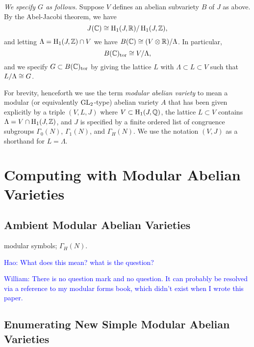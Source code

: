 \documentclass{article}
\newcommand{\Hao}[1]{\textcolor{blue}{\textsf{Hao: #1}}}
\newcommand{\wstein}[1]{\textcolor{blue}{\textsf{William: #1}}}
\begin{document}
{\em We specify $G$ as follows.}
Suppose $V$ defines an abelian subvariety $B$ of $J$ as above.
By the Abel-Jacobi theorem, we have
$$
 J(\mathbb{C}) \cong \operatorname{H}_1(J, \mathbb{R}) / \operatorname{H}_1(J,\mathbb{Z}),
$$
and letting $\Lambda = \operatorname{H}_1(J,\mathbb{Z}) \cap V$ we have
$B(\mathbb{C}) \cong (V\otimes\mathbb{R}) / \Lambda$.
In particular,
$$
  B(\mathbb{C})_{\operatorname{tor}} \cong V/\Lambda,
$$
and we specify $G\subset B(\mathbb{C})_{\operatorname{tor}}$ by giving the lattice $L$ with
$\Lambda \subset L\subset V$ such that $L/\Lambda \cong G$.


For brevity, henceforth we use the term {\em modular abelian variety}
to mean a modular (or equivalently $\operatorname{GL}_2$-type) abelian variety $A$
that has been given explicitly by a triple $(V,L,J)$ where $V\subset
\operatorname{H}_1(J,\mathbb{Q})$, the lattice $L\subset V$ contains $\Lambda = V\cap
\operatorname{H}_1(J,\mathbb{Z})$, and $J$ is specified by a finite ordered list of
congruence subgroups $\Gamma_0(N)$, $\Gamma_1(N)$, and $\Gamma_H(N)$.
We use the notation $(V,J)$ as a shorthand for $L=\Lambda$.



\section{Computing with Modular Abelian Varieties}

\subsection{Ambient Modular Abelian Varieties}
modular symbols; $\Gamma_H(N)$.

\Hao{What does this mean? what is the question?}

\wstein{There is no question mark and no question.  It can
probably be resolved via a reference to my modular forms book,
which didn't exist when I wrote this paper.}


\subsection{Enumerating New Simple Modular Abelian Varieties}
\end{document}
